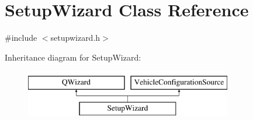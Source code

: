 \hypertarget{class_setup_wizard}{\section{Setup\-Wizard Class Reference}
\label{class_setup_wizard}
}


{\ttfamily \#include $<$setupwizard.\-h$>$}

Inheritance diagram for Setup\-Wizard\-:\begin{figure}[H]
\begin{center}
\leavevmode
\includegraphics[height=2.000000cm]{class_setup_wizard}
\end{center}
\end{figure}
